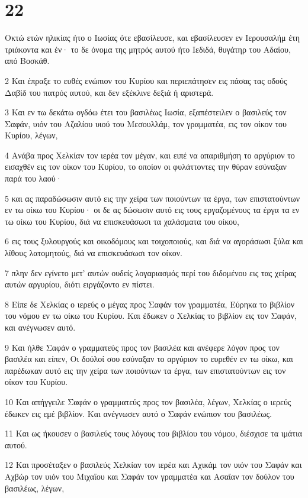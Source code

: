 \chapter{22}

\par Οκτώ ετών ηλικίας ήτο ο Ιωσίας ότε εβασίλευσε, και εβασίλευσεν εν Ιερουσαλήμ έτη τριάκοντα και έν· το δε όνομα της μητρός αυτού ήτο Ιεδιδά, θυγάτηρ του Αδαΐου, από Βοσκάθ.
\par 2 Και έπραξε το ευθές ενώπιον του Κυρίου και περιεπάτησεν εις πάσας τας οδούς Δαβίδ του πατρός αυτού, και δεν εξέκλινε δεξιά ή αριστερά.
\par 3 Και εν τω δεκάτω ογδόω έτει του βασιλέως Ιωσία, εξαπέστειλεν ο βασιλεύς τον Σαφάν, υιόν του Αζαλίου υιού του Μεσουλλάμ, τον γραμματέα, εις τον οίκον του Κυρίου, λέγων,
\par 4 Ανάβα προς Χελκίαν τον ιερέα τον μέγαν, και ειπέ να απαριθμήση το αργύριον το εισαχθέν εις τον οίκον του Κυρίου, το οποίον οι φυλάττοντες την θύραν εσύναξαν παρά του λαού·
\par 5 και ας παραδώσωσιν αυτό εις την χείρα των ποιούντων τα έργα, των επιστατούντων εν τω οίκω του Κυρίου· οι δε ας δώσωσιν αυτό εις τους εργαζομένους τα έργα τα εν τω οίκω του Κυρίου, διά να επισκευάσωσι τα χαλάσματα του οίκου,
\par 6 εις τους ξυλουργούς και οικοδόμους και τοιχοποιούς, και διά να αγοράσωσι ξύλα και λίθους λατομητούς, διά να επισκευάσωσι τον οίκον.
\par 7 πλην δεν εγίνετο μετ' αυτών ουδείς λογαριασμός περί του διδομένου εις τας χείρας αυτών αργυρίου, διότι ειργάζοντο εν πίστει.
\par 8 Είπε δε Χελκίας ο ιερεύς ο μέγας προς Σαφάν τον γραμματέα, Εύρηκα το βιβλίον του νόμου εν τω οίκω του Κυρίου. Και έδωκεν ο Χελκίας το βιβλίον εις τον Σαφάν, και ανέγνωσεν αυτό.
\par 9 Και ήλθε Σαφάν ο γραμματεύς προς τον βασιλέα και ανέφερε λόγον προς τον βασιλέα και είπεν, Οι δούλοί σου εσύναξαν το αργύριον το ευρεθέν εν τω οίκω, και παρέδωκαν αυτό εις την χείρα των ποιούντων τα έργα, των επιστατούντων εις τον οίκον του Κυρίου.
\par 10 Και απήγγειλε Σαφάν ο γραμματεύς προς τον βασιλέα, λέγων, Χελκίας ο ιερεύς έδωκεν εις εμέ βιβλίον. Και ανέγνωσεν αυτό ο Σαφάν ενώπιον του βασιλέως.
\par 11 Και ως ήκουσεν ο βασιλεύς τους λόγους του βιβλίου του νόμου, διέσχισε τα ιμάτια αυτού.
\par 12 Και προσέταξεν ο βασιλεύς Χελκίαν τον ιερέα και Αχικάμ τον υιόν του Σαφάν και Αχβώρ τον υιόν του Μιχαΐου και Σαφάν τον γραμματέα και Ασαΐαν τον δούλον του βασιλέως, λέγων,
